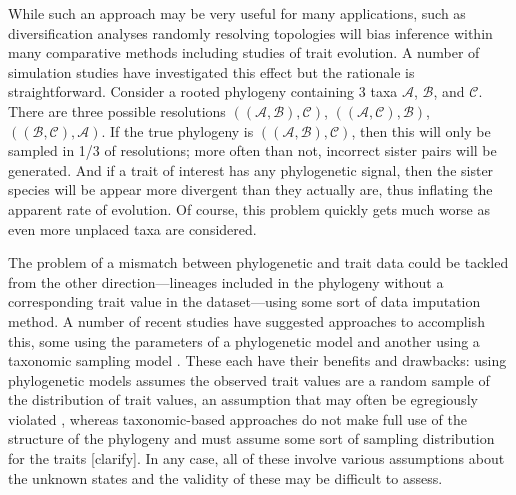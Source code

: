 \documentclass[a4paper,11pt]{article}
\begin{document}
While such an approach may be very useful for many applications, such as diversification analyses \citep{Kuhn2011, Rabosky2015} randomly resolving topologies will bias inference within many comparative methods including studies of trait evolution. A number of simulation studies have investigated this effect \citep{Losos1994, Martins1996, Davies2012, Bapst2014, Rabosky2015} but the rationale is straightforward. Consider a rooted phylogeny containing 3 taxa $\mathcal{A}$, $\mathcal{B}$, and $\mathcal{C}$. There are three possible resolutions $((\mathcal{A},\mathcal{B}),\mathcal{C})$, $((\mathcal{A},\mathcal{C}),\mathcal{B})$, $((\mathcal{B},\mathcal{C}),\mathcal{A})$. If the true phylogeny is $((\mathcal{A},\mathcal{B}),\mathcal{C})$, then this will only be sampled in 1/3 of resolutions; more often than not, incorrect sister pairs will be generated. And if a trait of interest has any phylogenetic signal, then the sister species will be appear more divergent than they actually are, thus inflating the apparent rate of evolution. Of course, this problem quickly gets much worse as even more unplaced taxa are considered.

The problem of a mismatch between phylogenetic and trait data could be tackled from the other direction---lineages included in the phylogeny without a corresponding trait value in the dataset---using some sort of data imputation method. A number of recent studies have suggested approaches to accomplish this, some using the parameters of a phylogenetic model \citep{Fagan2013, Swenson2014, PEM} and another using a taxonomic sampling model \citep{FitzJohn2014}. These each have their benefits and drawbacks: using phylogenetic models assumes the observed trait values are a random sample of the distribution of trait values, an assumption that may often be egregiously violated \citep{FitzJohn2014}, whereas taxonomic-based approaches do not make full use of the structure of the phylogeny and must assume some sort of sampling distribution for the traits [clarify]. In any case, all of these involve various assumptions about the unknown states and the validity of these may be difficult to assess.

\end{document}
